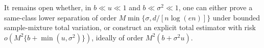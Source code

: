 It remains open whether, in \(b\ll u\ll1\) and \(b\ll\sigma^2\ll1\), one can either prove a same-class lower separation of order \(M\min\{\sigma,d/[n\log(en)]\}\) under bounded sample-mixture total variation, or construct an explicit total estimator with risk \(o\!\left(M^2\{b+\min(u,\sigma^2)\}\right)\), ideally of order \(M^2(b+\sigma^2u)\).